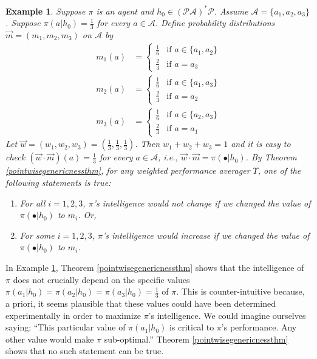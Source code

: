 \documentclass{article}
\newtheorem{example}[theorem]{Example}
\begin{document}
\begin{example}
\label{genericnessexample}
    Suppose $\pi$ is an agent and $h_0\in(\mathcal P\mathcal A)^*\mathcal P$.
    Assume $\mathcal A=\{a_1,a_2,a_3\}$.
    Suppose $\pi(a|h_0)=\frac13$ for every $a\in\mathcal A$.
    Define probability distributions $\vec m=(m_1,m_2,m_3)$ on $\mathcal A$ by
    \begin{align*}
        m_1(a) &=
        \begin{cases}
            \frac16 &\mbox{if $a\in\{a_1,a_2\}$}\\
            \frac23 &\mbox{if $a=a_3$}
        \end{cases}\\
        m_2(a) &=
        \begin{cases}
            \frac16 &\mbox{if $a\in\{a_1,a_3\}$}\\
            \frac23 &\mbox{if $a=a_2$}
        \end{cases}\\
        m_3(a) &=
        \begin{cases}
            \frac16 &\mbox{if $a\in\{a_2,a_3\}$}\\
            \frac23 &\mbox{if $a=a_1$}
        \end{cases}
    \end{align*}
    Let $\vec w=(w_1,w_2,w_3)=(\frac13,\frac13,\frac13)$. Then $w_1+w_2+w_3=1$ and
    it is easy to check
    $(\vec w\cdot\vec m)(a)=\frac13$ for every $a\in\mathcal A$,
    i.e., $\vec w\cdot\vec m=\pi(\bullet|h_0)$.
    By Theorem \ref{pointwisegenericnessthm},
    for any weighted performance averager $\Upsilon$,
    one of the following statements is true:
    \begin{enumerate}
        \item
        For all $i=1,2,3$, $\pi$'s intelligence would not change if we
        changed the value of $\pi(\bullet|h_0)$ to $m_i$. Or,
        \item
        For some $i=1,2,3$, $\pi$'s intelligence would increase if
        we changed the value of $\pi(\bullet|h_0)$ to $m_i$.
    \end{enumerate}
\end{example}

In Example \ref{genericnessexample}, Theorem \ref{pointwisegenericnessthm} shows
that the intelligence of $\pi$ does not crucially depend on the specific values
$\pi(a_1|h_0)=\pi(a_2|h_0)=\pi(a_3|h_0)=\frac13$ of $\pi$.
This is counter-intuitive because, a priori, it seems
plausible that these values could have been determined
experimentally in order to maximize $\pi$'s intelligence. We could imagine ourselves
saying: ``This particular value of $\pi(a_1|h_0)$ is critical to $\pi$'s
performance. Any other value would make $\pi$ sub-optimal.''
Theorem \ref{pointwisegenericnessthm} shows that no such statement can be true.
\end{document}
